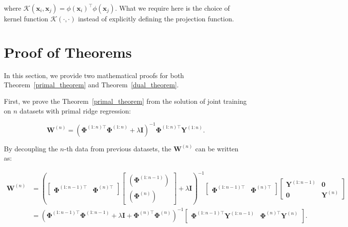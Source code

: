 where \( \mathcal{K}\left(\mathbf{x}_i, \mathbf{x}_j\right) = \phi\left(\mathbf{x}_i\right)^\top \phi\left(\mathbf{x}_j\right) \). What we require here is the choice of kernel function $\mathcal{K}\left(\cdot, \cdot\right)$ instead of explicitly defining the projection function.

\section{Proof of Theorems}
\label{app:proof}
In this section, we provide two mathematical proofs for both Theorem~\ref{primal_theorem} and Theorem~\ref{dual_theorem}.

First, we prove the Theorem~\ref{primal_theorem} from the solution of joint training on $n$ datasets with primal ridge regression:

\begin{equation}
\label{joint_solution}
    \mathbf{W}^{\left(n\right)} = 
    \left(\mathbf{\Phi}^{\left(1:n\right) \top} \mathbf{\Phi}^{\left(1:n\right)} + \lambda \mathbf{I}\right)^{-1} \mathbf{\Phi}^{\left(1:n\right) \top} \mathbf{Y}^{\left(1:n\right)}.
\end{equation}

By decoupling the $n$-th data from previous datasets, the $\mathbf{W}^{\left(n\right)}$ can be written as:

\begin{equation}
\label{eqn:decouple}
\begin{aligned}
\mathbf{W}^{\left(n\right)} 
&= \left(
\begin{bmatrix}
    {\mathbf{\Phi}^{\left(1:n-1\right)\top}} & {\mathbf{\Phi}^{\left(n\right)\top}}
\end{bmatrix}
\begin{bmatrix}
    {\left(\mathbf{\Phi}^{\left(1:n-1\right)}\right)} \\
    {\left(\mathbf{\Phi}^{\left(n\right)}\right)}
\end{bmatrix}
 + \lambda \mathbf{I}\right)^{-1}
 \begin{bmatrix}
    {\mathbf{\Phi}^{\left(1:n-1\right)\top}}  & {\mathbf{\Phi}^{\left(n\right)\top}}
\end{bmatrix}
\begin{bmatrix}
    \mathbf{Y}^{\left(1:n-1\right)} & \mathbf{0} \\
    \mathbf{0} & \mathbf{Y}^{\left(n\right)}
\end{bmatrix} \\
            &=
\left({\mathbf{\Phi}^{\left(1:n-1\right)\top}}      
      {\mathbf{\Phi}^{\left(1:n-1\right)}}  
      + \lambda \mathbf{I}
      +{\mathbf{\Phi}^{\left(n\right)\top}}{\mathbf{\Phi}^{\left(n\right)}}\right)^{-1}
\begin{bmatrix}
    {\mathbf{\Phi}^{\left(1:n-1\right)\top}} \mathbf{Y}^{\left(1:n-1\right)} & {\mathbf{\Phi}^{\left(n\right)\top}}
    \mathbf{Y}^{\left(n\right)}\\
\end{bmatrix}.
\end{aligned}
\end{equation}

